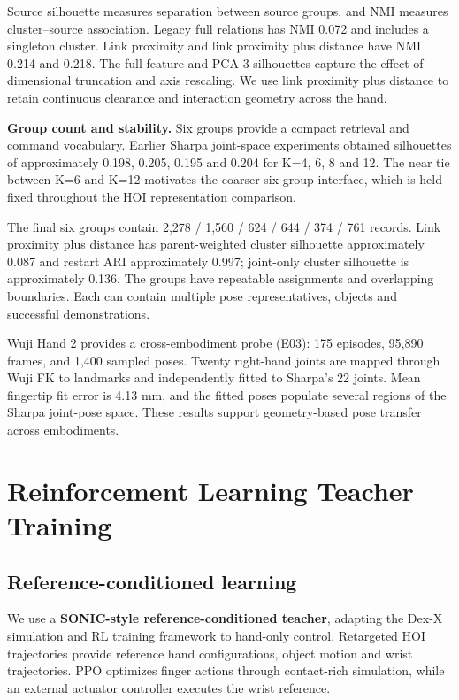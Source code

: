 \documentclass[10pt,twocolumn]{article}
\begin{document}
Source silhouette measures separation between source groups, and NMI measures cluster--source association. Legacy full relations has NMI 0.072 and includes a singleton cluster. Link proximity and link proximity plus distance have NMI 0.214 and 0.218. The full-feature and PCA-3 silhouettes capture the effect of dimensional truncation and axis rescaling. We use link proximity plus distance to retain continuous clearance and interaction geometry across the hand.

\textbf{Group count and stability.} Six groups provide a compact retrieval and command vocabulary. Earlier Sharpa joint-space experiments obtained silhouettes of approximately 0.198, 0.205, 0.195 and 0.204 for K=4, 6, 8 and 12. The near tie between K=6 and K=12 motivates the coarser six-group interface, which is held fixed throughout the HOI representation comparison.

The final six groups contain 2,278 / 1,560 / 624 / 644 / 374 / 761 records. Link proximity plus distance has parent-weighted cluster silhouette approximately 0.087 and restart ARI approximately 0.997; joint-only cluster silhouette is approximately 0.136. The groups have repeatable assignments and overlapping boundaries. Each can contain multiple pose representatives, objects and successful demonstrations.

Wuji Hand 2 provides a cross-embodiment probe (E03): 175 episodes, 95,890 frames, and 1,400 sampled poses. Twenty right-hand joints are mapped through Wuji FK to landmarks and independently fitted to Sharpa's 22 joints. Mean fingertip fit error is 4.13 mm, and the fitted poses populate several regions of the Sharpa joint-pose space. These results support geometry-based pose transfer across embodiments.

\section{Reinforcement Learning Teacher Training}

\subsection{Reference-conditioned learning}

We use a \textbf{SONIC-style reference-conditioned teacher}, adapting the Dex-X simulation and RL training framework \citep{chen2026dexx} to hand-only control. Retargeted HOI trajectories provide reference hand configurations, object motion and wrist trajectories. PPO \citep{schulman2017} optimizes finger actions through contact-rich simulation, while an external actuator controller executes the wrist reference.
\end{document}
